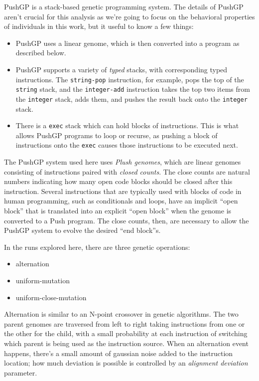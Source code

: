PushGP \citep{spector:2002:GPEM, 1068292} is a stack-based genetic programming system. The details
of PushGP aren't crucial for this analysis as we're going to focus on the behavioral properties of
individuals in this work, but it useful to know a few things:
\begin{itemize}
	\item PushGP uses a linear genome, which is then converted into a program as described below.
	\item PushGP supports a variety of \emph{typed} stacks, with corresponding typed instructions.
	The \texttt{string-pop} instruction, for example, pops the top of the \texttt{string} stack,
	and the \texttt{integer-add} instruction takes the top two items from the \texttt{integer}
	stack, adds them, and pushes the result back onto the \texttt{integer} stack.
	\item There is a \texttt{exec} stack which can hold blocks of instructions. This is what allows
	PushGP programs to loop or recurse, as pushing a block of instructions onto the \texttt{exec}
	causes those instructions to be executed next.
\end{itemize}

The PushGP system used here uses \emph{Plush genomes}, which are linear genomes consisting of 
instructions paired with \emph{closed counts}. The close counts are natural numbers 
indicating how many open code blocks should be closed after this instruction. Several instructions
that are typically used with blocks of code in human programming, such as conditionals and loops,
have an implicit ``open block'' that is translated into an explicit ``open block'' when the genome
is converted to a Push program. The close counts, then, are necessary to allow the PushGP
system to evolve the desired ``end block''s.

In the runs explored here, there are three genetic operations:
\begin{itemize}
	\item alternation
	\item uniform-mutation
	\item uniform-close-mutation
\end{itemize}
Alternation is similar to an N-point crossover in genetic algorithms. The two parent genomes
are traversed from left to right taking instructions from one or the other for the child, with
a small probability at each instruction of switching which parent is being used as the instruction
source. When an alternation event happens, there's a small amount of gaussian noise added to the
instruction location; how much deviation is possible is controlled by an \emph{alignment deviation} 
parameter.

